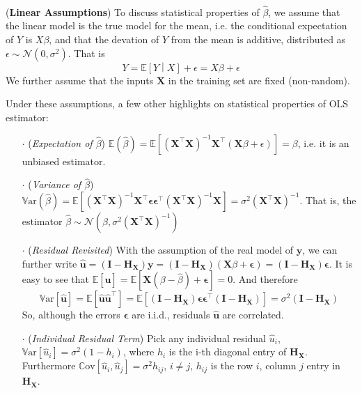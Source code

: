 \documentclass[a4paper, 11pt]{article}
\begin{document}
~\\
(\textbf{Linear Assumptions}) To discuss statistical properties of $\hat{\beta}$, we assume that the linear model is the true model for the mean, i.e. the conditional expectation of $Y$ is $X\beta$, and that the devation of $Y$ from the mean is additive, distributed as $\epsilon \sim \mathcal{N}(0, \sigma^2)$. That is 
$$
Y=\mathbb{E}\left[Y\middle|X\right] + \epsilon = X\beta + \epsilon
$$
We further assume that the inputs $\bm{X}$ in the training set are fixed (non-random). 

Under these assumptions, a few other highlights on statistical properties of OLS estimator:
\begin{itemize}
	\item[$\cdot$] (\emph{Expectation of $\hat{\beta}$}) $\mathbb{E}(\hat{\beta}) = \mathbb{E}\left[(\bm{X}^{\top}\bm{X})^{-1} \bm{X}^{\top}(\bm{X}\beta + \epsilon)\right] = \beta$, i.e. it is an unbiased estimator.
	\item[$\cdot$] (\emph{Variance of $\hat{\beta}$}) $\mathrm{\mathbb{V}ar}(\hat{\beta}) = \mathbb{E}\left[(\bm{X}^{\top}\bm{X})^{-1} \bm{X}^{\top} \bm{\epsilon} \bm{\epsilon}^{\top}(\bm{X}^{\top} \bm{X})^{-1} \bm{X}\right] = \sigma^2 (\bm{X}^{\top} \bm{X})^{-1}$. That is, the estimator $\hat{\beta}\sim \mathcal{N}(\beta, \sigma^2(\bm{X}^{\top} \bm{X})^{-1})$
	\item[$\cdot$] (\emph{Residual Revisited}) With the assumption of the real model of $\bm{y}$, we can further write $\hat{\bm{u}}=(\bm{I}-\bm{H}_{\bm{X}})\bm{y} = (\bm{I}-\bm{H}_{\bm{X}})(\bm{X}\beta+\bm{\epsilon}) =(\bm{I}-\bm{H}_{\bm{X}}) \bm{\epsilon} $.
	It is easy to see that $\mathbb{E}\left[\hat{\bm{u}}\right] = \mathbb{E}\left[\bm{X}(\beta-\hat{\beta})+\bm{\epsilon}\right] = 0$. And therefore
	$$
	\mathrm{\mathbb{V}ar}\left[\hat{\bm{u}}\right] = \mathbb{E}[\hat{\bm{u}}\hat{\bm{u}}^{\top}] = \mathbb{E}\left[(\bm{I}-\bm{H}_{\bm{X}}) \bm{\epsilon} \bm{\epsilon}^{\top}(\bm{I}-\bm{H}_{\bm{X}})\right] = \sigma^2 (\bm{I}-\bm{H}_{\bm{X}})
	$$
	So, although the errors $\bm{\epsilon}$ are i.i.d., residuals $\hat{\bm{u}}$ are correlated. 
	\item[$\cdot$] (\emph{Individual Residual Term}) Pick any individual residual $\hat{u}_i$, $\mathrm{\mathbb{V}ar}\left[\hat{u}_i\right] = \sigma^2(1-h_i)$, where $h_i$ is the i-th diagonal entry of $\bm{H}_{\bm{X}}$. Furthermore $\mathrm{\mathbb{C}ov}\left[\hat{u}_i, \hat{u}_j\right] = \sigma^2 h_{ij}$, $i\ne j$, $h_{ij}$ is the row $i$, column $j$ entry in $\bm{H}_{\bm{X}}$.
\end{itemize}
\end{document}
